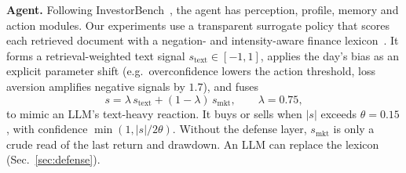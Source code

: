 \textbf{Agent.} Following InvestorBench~\cite{li2025investorbench}, the agent has perception, profile, memory and action modules. Our experiments use a transparent surrogate policy that scores each retrieved document with a negation- and intensity-aware finance lexicon~\cite{loughran2011liability}. It forms a retrieval-weighted text signal $s_{\mathrm{text}}\in[-1,1]$, applies the day's bias as an explicit parameter shift (e.g.\ overconfidence lowers the action threshold, loss aversion amplifies negative signals by $1.7$), and fuses
\begin{equation}
s=\lambda\,s_{\mathrm{text}}+(1-\lambda)\,s_{\mathrm{mkt}},\qquad \lambda=0.75,
\end{equation}
to mimic an LLM's text-heavy reaction. It buys or sells when $|s|$ exceeds $\theta=0.15$, with confidence $\min(1,|s|/2\theta)$. Without the defense layer, $s_{\mathrm{mkt}}$ is only a crude read of the last return and drawdown. An LLM can replace the lexicon (Sec.~\ref{sec:defense}).
